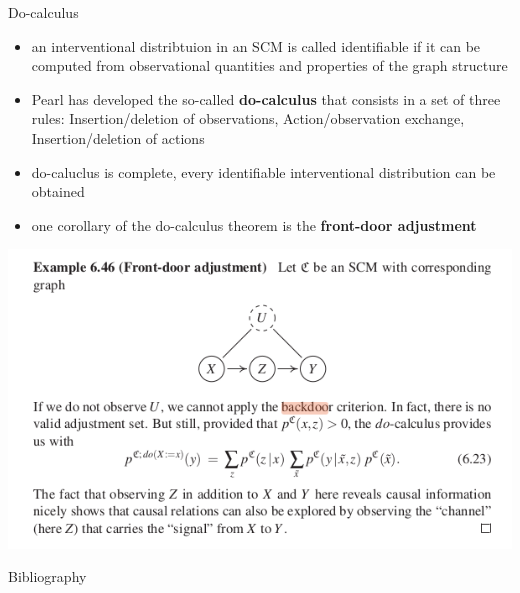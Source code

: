 \documentclass{beamer}
\begin{document}
\begin{frame}{Do-calculus}
  \begin{itemize}
    \item<1-> an interventional distribtuion in an SCM is called identifiable if it can be computed from observational quantities and properties of the graph structure 
    \item<2-> Pearl has developed the so-called \textbf{do-calculus} that consists in a set of three rules: Insertion/deletion of observations, Action/observation exchange, Insertion/deletion of actions
    \item<3-> do-caluclus is complete, every identifiable interventional distribution can be obtained 
    \item<4-> one corollary of the do-calculus theorem is the \textbf{front-door adjustment} 
  \end{itemize}

\end{frame}

\begin{frame}
	\includegraphics[scale=0.5]{front}
\end{frame}

\begin{frame}[allowframebreaks]{Bibliography}
  \tiny

\end{frame}
\end{document}
